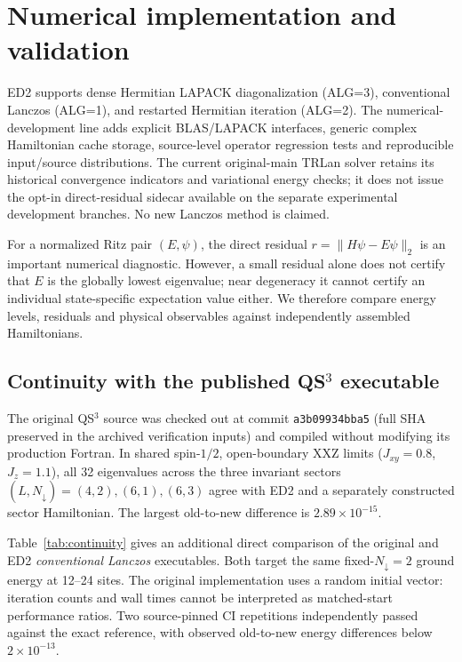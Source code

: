 \documentclass[preprint,12pt,nopreprintline]{elsarticle}
\newcommand{\QSthree}{QS$^{3}$}
\newcommand{\updn}{N_{\downarrow}}
\begin{document}
\section{Numerical implementation and validation}
ED2 supports dense Hermitian LAPACK diagonalization (ALG=3),
conventional Lanczos (ALG=1), and restarted Hermitian iteration
(ALG=2). The numerical-development line adds explicit
BLAS/LAPACK interfaces, generic complex Hamiltonian cache
storage, source-level operator regression tests and reproducible
input/source distributions. The current original-main TRLan
solver retains its historical convergence indicators and
variational energy checks; it does not issue the opt-in
direct-residual sidecar available on the separate experimental
development branches. No new Lanczos method is claimed.

For a normalized Ritz pair $(E,\psi)$, the direct residual
$r=\|H\psi-E\psi\|_2$ is an important numerical diagnostic.
However, a small residual alone does not certify that $E$
is the globally lowest eigenvalue; near degeneracy it cannot
certify an individual state-specific expectation value either.
We therefore compare energy levels, residuals and physical
observables against independently assembled Hamiltonians.

\subsection{Continuity with the published QS$^3$ executable}
The original \QSthree{} source was checked out at
commit \texttt{a3b09934bba5} (full SHA preserved in
the archived verification inputs) and compiled
without modifying its production Fortran. In shared spin-$1/2$,
open-boundary XXZ limits ($J_{xy}=0.8$, $J_z=1.1$),
all 32 eigenvalues across the three invariant sectors
$(L,\updn)=(4,2),(6,1),(6,3)$ agree with ED2 and a separately
constructed sector Hamiltonian. The largest old-to-new
difference is $2.89\times10^{-15}$.

Table~\ref{tab:continuity} gives an additional direct comparison
of the original and ED2 \emph{conventional Lanczos} executables.
Both target the same fixed-$\updn=2$ ground energy at 12--24 sites.
The original implementation uses a random initial vector:
iteration counts and wall times cannot be interpreted as
matched-start performance ratios. Two source-pinned CI repetitions
independently passed against the exact reference, with observed
old-to-new energy differences below $2\times10^{-13}$.
\end{document}

